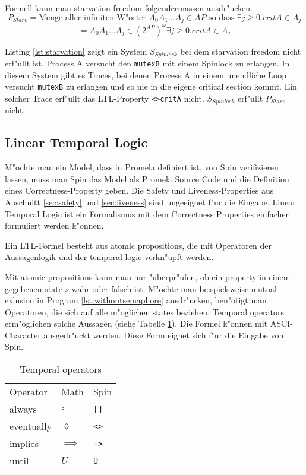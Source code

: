 \documentclass[a4paper, twoside]{article}
\begin{document}
Formell kann man starvation freedom folgendermassen ausdr"ucken.
\[
P_{Starv} = \text{Menge aller infiniten W"orter } A_0 A_1 \dots A_j \in AP \text{ so dass }\exists j \geq 0. critA \in A_j
\]
\[
 = { A_0 A_1 \dots A_j \in (2^{AP})^{\omega} \exists j \geq 0. critA \in A_j}
\]

Listing \ref{lst:starvation} zeigt ein System $S_{Spinlock}$ bei dem starvation freedom nicht erf"ullt ist. Process A versucht den \verb|mutexB| mit einem Spinlock zu erlangen. In diesem System gibt es Traces, bei denen Process A in einem unendliche Loop versucht \verb|mutexB| zu erlangen und so nie in die eigene critical section kommt. Ein solcher Trace erf"ullt das LTL-Property \verb|<>critA| nicht. $S_{Spinlock}$ erf"ullt $P_{Starv}$ nicht.



\subsection{Linear Temporal Logic}
\label{sec:lineartemporallogic}

M"ochte man ein Model, dass in Promela definiert ist, von Spin verifizieren lassen, muss man Spin das Model als Promela Source Code und die Definition eines Correctness-Property geben. Die Safety und Liveness-Properties aus Abschnitt \ref{sec:safety} und \ref{sec:liveness} sind ungeeignet f"ur die Eingabe. Linear Temporal Logic ist ein Formalismus mit dem Correctness Properties einfacher formuliert werden k"onnen.

Ein LTL-Formel besteht aus atomic propositions, die mit Operatoren der Aussagenlogik  und der temporal logic verkn"upft werden.

Mit atomic propositions kann man nur "uberpr"ufen, ob ein property in einem gegebenen state $s$ wahr oder falsch ist. M"ochte man beispielsweise mutual exlusion in Program \ref{lst:withoutsemaphore} ausdr"ucken, ben"otigt man Operatoren, die sich auf alle m"oglichen states beziehen. Temporal operators erm"oglichen solche Aussagen (siehe Tabelle \ref{tab:temporal_operators}). Die Formel k"onnen mit ASCI-Character ausgedr"uckt werden. Diese Form eignet sich f"ur die Eingabe von Spin.

\begin{table}
  \centering
  \begin{tabular}{l l l}
    Operator & Math & Spin \\
    always & $\square$ & \verb|[]| \\
    eventually & $\lozenge$ & \verb|<>| \\
    implies & $\implies$ & \verb|->| \\
    until & $U$ & \verb|U|
  \end{tabular}
  \caption{Temporal operators }
  \label{tab:temporal_operators}
\end{table}
\end{document}
